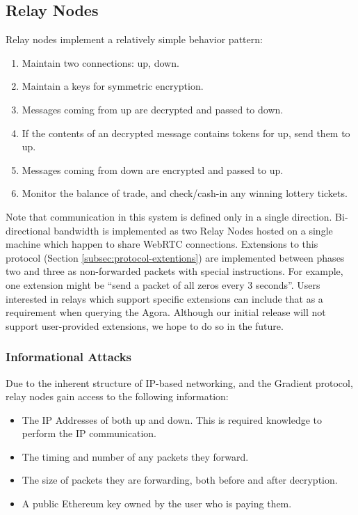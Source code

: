 \documentclass{article}
\begin{document}
\subsection{Relay Nodes}

Relay nodes implement a relatively simple behavior pattern:

\begin{enumerate}
    \item Maintain two connections: up, down.
    \item Maintain a keys for symmetric encryption.
    \item Messages coming from up are decrypted and passed to down.
    \item If the contents of an decrypted message contains tokens for up, send them to up.
    \item Messages coming from down are encrypted and passed to up.
    \item Monitor the balance of trade, and check/cash-in any winning lottery tickets.
\end{enumerate}

Note that communication in this system is defined only in a single direction. Bi-directional bandwidth is implemented as two Relay Nodes hosted on a single machine which happen to share WebRTC connections. Extensions to this protocol (Section \ref{subsec:protocol-extentions}) are implemented between phases two and three as non-forwarded packets with special instructions. For example, one extension might be “send a packet of all zeros every 3 seconds”. Users interested in relays which support specific extensions can include that as a requirement when querying the Agora. Although our initial release will not support user-provided extensions, we hope to do so in the future.

\subsubsection{Informational Attacks}

Due to the inherent structure of IP-based networking, and the Gradient protocol, relay nodes gain access to the following information:

\begin{itemize}
    \item The IP Addresses of both up and down. This is required knowledge to perform the IP communication.
    \item The timing and number of any packets they forward.
    \item The size of packets they are forwarding, both before and after decryption.
    \item A public Ethereum key owned by the user who is paying them.
\end{itemize}
\end{document}
